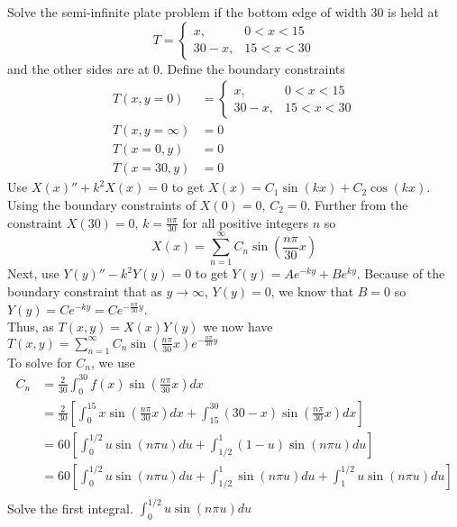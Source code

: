 \item [4.] Solve the semi-infinite plate problem if the bottom edge of width 30 is held at
\[
T = 
\begin{cases}
    x, & 0 < x < 15\\
    30 - x, & 15 < x < 30 
\end{cases}
\]
and the other sides are at 0\textdegree.
Define the boundary constraints
\begin{align*}
    T(x,y=0)&=
    \begin{cases}
        x, & 0 < x < 15\\
        30 - x, & 15 < x < 30 
    \end{cases}\\
    T(x,y=\infty)&=0\\
    T(x=0,y)&=0\\
    T(x=30,y)&=0
\end{align*}
Use $X(x)''+k^2X(x) = 0$ to get $X(x) = C_1\sin(kx)+C_2\cos(kx)$. Using the boundary constraints of $X(0) = 0$, $C_2 = 0$. Further from the constraint $X(30) = 0$, $k = \frac{n\pi}{30}$ for all positive integers $n$ so 
\[\displaystyle X(x) = \sum_{n=1}^{\infty} C_n \sin\left(\frac{n\pi}{30}x\right)\]
Next, use $Y(y)''-k^2Y(y)=0$ to get $Y(y) = Ae^{-ky}+Be^{ky}$. Because of the boundary constraint that as $y \rightarrow \infty$, $Y(y) = 0$, we know that $B = 0$ so $Y(y) = Ce^{-ky} = Ce^{-\frac{n\pi}{30}y}$.\\[2mm]
Thus, as $T(x,y) = X(x)Y(y)$ we now have $\displaystyle T(x,y) = \sum_{n=1}^{\infty} C_n \sin\left(\frac{n\pi}{30} x\right) e^{-\frac{n\pi}{30}y}$\\[2mm]
To solve for $C_n$, we use \begin{align*}
    C_n &= \frac{2}{30} \int_0^{30} f(x)\sin\left(\frac{n\pi}{30} x\right) dx \\
    &=\frac{2}{30} 
    \left[
    \int_{0}^{15} x\sin\left(\frac{n\pi}{30} x\right) dx  + 
    \int_{15}^{30} (30 - x) \sin\left(\frac{n\pi}{30} x\right) dx
    \right]\\
    &=60
    \left[
    \int_{0}^{1/2} u\sin\left(n\pi u\right) du  + 
    \int_{1/2}^{1} (1 - u) \sin\left(n\pi u\right) du
    \right]\\
    &=60
    \left[
    \int_{0}^{1/2} u\sin\left(n\pi u\right) du  + 
    \int_{1/2}^{1} \sin\left(n\pi u\right) du +
    \int_{1}^{1/2} u\sin\left(n\pi u\right) du
    \right]\\
\end{align*}
Solve the first integral. $\displaystyle \int_{0}^{1/2} u\sin\left(n\pi u\right) du$
